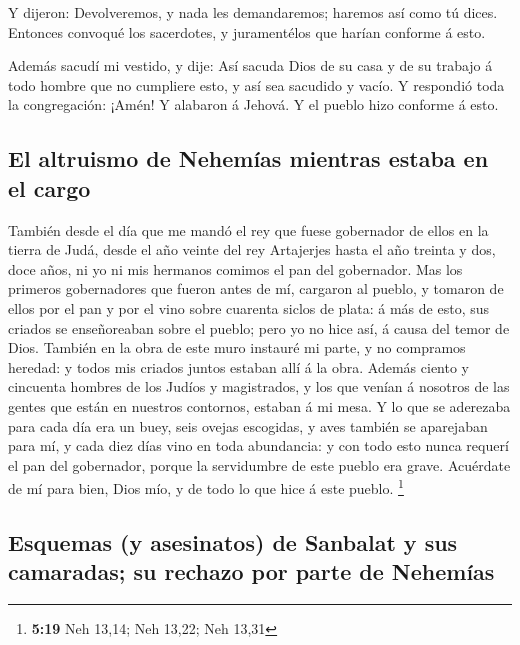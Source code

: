  Y dijeron: Devolveremos, y nada les demandaremos;
haremos así como tú dices. Entonces convoqué los sacerdotes, y
juramentélos que harían conforme á esto.

 Además sacudí mi vestido, y dije: Así sacuda Dios de su
casa y de su trabajo á todo hombre que no cumpliere esto, y así sea
sacudido y vacío. Y respondió toda la congregación: ¡Amén! Y alabaron á
Jehová. Y el pueblo hizo conforme á esto.

\hypertarget{el-altruismo-de-nehemuxedas-mientras-estaba-en-el-cargo}{%
\subsection{El altruismo de Nehemías mientras estaba en el
cargo}\label{el-altruismo-de-nehemuxedas-mientras-estaba-en-el-cargo}}

 También desde el día que me mandó el rey que fuese
gobernador de ellos en la tierra de Judá, desde el año veinte del rey
Artajerjes hasta el año treinta y dos, doce años, ni yo ni mis hermanos
comimos el pan del gobernador.  Mas los primeros
gobernadores que fueron antes de mí, cargaron al pueblo, y tomaron de
ellos por el pan y por el vino sobre cuarenta siclos de plata: á más de
esto, sus criados se enseñoreaban sobre el pueblo; pero yo no hice así,
á causa del temor de Dios.  También en la obra de este
muro instauré mi parte, y no compramos heredad: y todos mis criados
juntos estaban allí á la obra.  Además ciento y cincuenta
hombres de los Judíos y magistrados, y los que venían á nosotros de las
gentes que están en nuestros contornos, estaban á mi mesa.
 Y lo que se aderezaba para cada día era un buey, seis
ovejas escogidas, y aves también se aparejaban para mí, y cada diez días
vino en toda abundancia: y con todo esto nunca requerí el pan del
gobernador, porque la servidumbre de este pueblo era grave.
 Acuérdate de mí para bien, Dios mío, y de todo lo que
hice á este pueblo. \footnote{\textbf{5:19} Neh 13,14; Neh 13,22; Neh
  13,31}

\hypertarget{esquemas-y-asesinatos-de-sanbalat-y-sus-camaradas-su-rechazo-por-parte-de-nehemuxedas}{%
\subsection{Esquemas (y asesinatos) de Sanbalat y sus camaradas; su
rechazo por parte de
Nehemías}\label{esquemas-y-asesinatos-de-sanbalat-y-sus-camaradas-su-rechazo-por-parte-de-nehemuxedas}}

